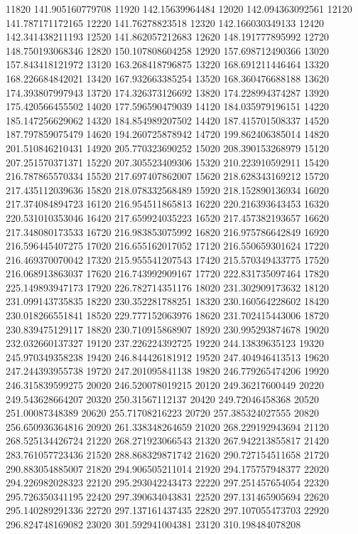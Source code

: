 {11820 141.905160779708
11920 142.15639964484
12020 142.094363092561
12120 141.787171172165
12220 141.76278823518
12320 142.166030349133
12420 142.341438211193
12520 141.862057212683
12620 148.191777895992
12720 148.750193068346
12820 150.107808604258
12920 157.698712490366
13020 157.843418121972
13120 163.268418796875
13220 168.691211446464
13320 168.226684842021
13420 167.932663385254
13520 168.360476688188
13620 174.393807997943
13720 174.326373126692
13820 174.228994374287
13920 175.420566455502
14020 177.596590479039
14120 184.035979196151
14220 185.147256629062
14320 184.854989207502
14420 187.415701508337
14520 187.797859075479
14620 194.260725878942
14720 199.862406385014
14820 201.510846210431
14920 205.770323690252
15020 208.390153268979
15120 207.251570371371
15220 207.305523409306
15320 210.223910592911
15420 216.787865570334
15520 217.697407862007
15620 218.628343169212
15720 217.435112039636
15820 218.078332568489
15920 218.152890136934
16020 217.374084894723
16120 216.954511865813
16220 220.216393643453
16320 220.531010353046
16420 217.659924035223
16520 217.457382193657
16620 217.348080173533
16720 216.983853075992
16820 216.975786642849
16920 216.596445407275
17020 216.655162017052
17120 216.550659301624
17220 216.469370070042
17320 215.955541207543
17420 215.570349433775
17520 216.068913863037
17620 216.743992909167
17720 222.831735097464
17820 225.149893947173
17920 226.782714351176
18020 231.302909173632
18120 231.099143735835
18220 230.352281788251
18320 230.160564228602
18420 230.018266551841
18520 229.777152063976
18620 231.702415443006
18720 230.839475129117
18820 230.710915868907
18920 230.995293874678
19020 232.032660137327
19120 237.226224392725
19220 244.13839635123
19320 245.970349358238
19420 246.844426181912
19520 247.404946413513
19620 247.244393955738
19720 247.201095841138
19820 246.779265474206
19920 246.315839599275
20020 246.520078019215
20120 249.36217600449
20220 249.543628664207
20320 250.31567112137
20420 249.72046458368
20520 251.00087348389
20620 255.71708216223
20720 257.385324027555
20820 256.650936364816
20920 261.338348264659
21020 268.229192943694
21120 268.525134426724
21220 268.271923066543
21320 267.942213855817
21420 283.761057723436
21520 288.868329871742
21620 290.727154511658
21720 290.883054885007
21820 294.906505211014
21920 294.175757948377
22020 294.226982028323
22120 295.293042243473
22220 297.251457654054
22320 295.726350341195
22420 297.390634043831
22520 297.131465905694
22620 295.140289291336
22720 297.137161437435
22820 297.107055473703
22920 296.824748169082
23020 301.592941004381
23120 310.198484078208
}

